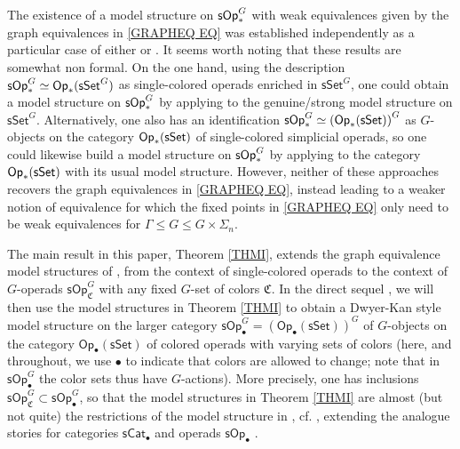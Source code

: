 \documentclass[a4paper,10pt
]{article}%
\numberwithin{equation}{section}
\numberwithin{figure}{section}
\theoremstyle{definition} %
\newcommand{\sSet}{\ensuremath{\mathsf{sSet}}}%
\newcommand{\Op}{\mathsf{Op}}%
\newcommand{\sOp}{\ensuremath{\mathsf{sOp}}}%
\newcommand{\1}{\ensuremath{\mathbbm 1}}%
\begin{document}
The existence of a model structure 
on $\mathsf{sOp}^G_{\**}$
with weak equivalences given by the graph equivalences
in \eqref{GRAPHEQ EQ}
was established independently as a particular case of either
\cite[Thm. I]{BP21} or \cite[Thm. 3.1]{GW18}.
It seems worth noting that these results are somewhat non formal.
On the one hand, using the description 
$\mathsf{sOp}_{\**}^G \simeq \mathsf{Op}_{\**}(\mathsf{sSet}^G)$
as single-colored operads enriched in 
$\mathsf{sSet}^G$,
one could obtain a model structure
on $\mathsf{sOp}_{\**}^G$
by applying \cite[Thm. 3.2]{BM03}
to the genuine/strong model structure on $\mathsf{sSet}^G$.
Alternatively, one also has an identification
$\mathsf{sOp}_{\**}^G \simeq 
\left(\mathsf{Op}_{\**}(\mathsf{sSet})\right)^G$
as $G$-objects on the category
$\mathsf{Op}_{\**}(\mathsf{sSet})$
of single-colored simplicial operads,
so one could likewise build a model structure on 
$\mathsf{sOp}_{\**}^G$
by applying \cite[Prop. 2.6]{Ste16}
to the category
$\mathsf{Op}_{\**}(\mathsf{sSet})$
with its usual model structure.
However, neither of these approaches
recovers the graph equivalences in \eqref{GRAPHEQ EQ},
instead leading to a weaker notion of equivalence for which the fixed points in \eqref{GRAPHEQ EQ}
only need to be weak equivalences for
$\Gamma \leq G \leq G \times \Sigma_n$.


The main result in this paper, 
Theorem \ref{THMI}, %
extends the graph equivalence model structures of
\cite[Thm. I]{BP21}, \cite[Thm. 3.1]{GW18}
from the context of single-colored operads 
to the context of $G$-operads
$\sOp^G_{\mathfrak C}$
with any fixed $G$-set of colors $\mathfrak{C}$.
In the direct sequel \cite{BP_ACOP},
we will then use the model structures in 
Theorem \ref{THMI} to obtain a Dwyer-Kan style model structure
\cite[Thm. \ref{AC-THMA}]{BP_ACOP}
on the larger category
$\sOp^G_\bullet = \left(\Op_\bullet(\sSet)\right)^G$
of $G$-objects on the category $\Op_\bullet(\sSet)$
of colored operads with varying sets of colors
(here, and throughout, we use $\bullet$ to indicate that colors are allowed to change;
note that in $\sOp^G_\bullet$ the color sets
thus have $G$-actions).
%
More precisely, one has inclusions
$\sOp^G_{\mathfrak C} \subset \sOp^G_\bullet$,
so that the model structures in Theorem \ref{THMI}
are almost (but not quite)
the restrictions of the model structure in 
\cite[Thm. \ref{AC-THMA}]{BP_ACOP},
cf. \cite[Prop. \ref{AC-FIBERGLMOD PROP}]{BP_ACOP},
extending the analogue stories for categories
$\mathsf{sCat}_\bullet$
\cite{Ber07b,BM13}
and operads $\mathsf{sOp}_\bullet$
\cite{Rob,CM13b,Cav}.
\end{document}
